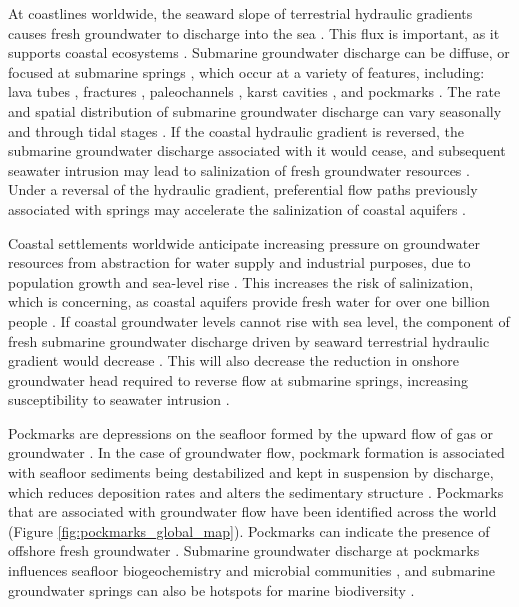 \documentclass[draft, 10pt]{agujournal2019}
\begin{document}
At coastlines worldwide, the seaward slope of terrestrial hydraulic gradients causes fresh groundwater to discharge into the sea \cite{arevalo-martinez_ideas_2023, taniguchi_submarine_2019, moore_effect_2010}.
This flux is important, as it supports coastal ecosystems \cite{burnett_groundwater_2003, moore_effect_2010}.
Submarine groundwater discharge can be diffuse, or focused at submarine springs \cite{taniguchi_submarine_2019},
which occur at a variety of features, including: lava tubes \cite{swarzenski_observations_2017},
fractures \cite{bokuniewicz_direct_2008, taniguchi_temporal_2008}, paleochannels \cite{mulligan_role_2007},
karst cavities \cite{fleury_submarine_2007}, and pockmarks \cite{hoffmann_fresh_2023, schluter_spatial_2004}.
The rate and spatial distribution of submarine groundwater discharge can vary seasonally and through tidal stages \cite{taniguchi_submarine_2019, lee_submarine_2016, dulai_autonomous_2016}.
If the coastal hydraulic gradient is reversed, the submarine groundwater discharge associated with it would cease,
and subsequent seawater intrusion may lead to salinization of fresh groundwater resources \cite{werner_seawater_2013, taniguchi_submarine_2019}.
Under a reversal of the hydraulic gradient, preferential flow paths previously associated with springs may accelerate the salinization of coastal aquifers \cite{geng_preferential_2020, xu_long_2016, falls_hydrogeology_2005}.

Coastal settlements worldwide anticipate increasing pressure on groundwater resources from abstraction for water supply and industrial purposes, due to population growth and sea-level rise \cite{michael_science_2017, oude_essink_effects_2010}.
This increases the risk of salinization, which is concerning, as coastal aquifers provide fresh water for over one billion people  \cite{ferguson_vulnerability_2012}.
If coastal groundwater levels cannot rise with sea level, the component of fresh submarine groundwater discharge driven by seaward terrestrial hydraulic gradient would decrease \cite{morgan_sea-level_2024}.
This will also decrease the reduction in onshore groundwater head required to reverse flow at submarine springs,
increasing susceptibility to seawater intrusion \cite{werner_classification_2017}.

Pockmarks are depressions on the seafloor formed by the upward flow of gas or groundwater \cite{hovland_significance_2002}.
In the case of groundwater flow, pockmark formation is associated with seafloor sediments being destabilized and kept in suspension by discharge,
which reduces deposition rates and alters the sedimentary structure \cite{micallef_can_2023, zhang_review_2025}.
Pockmarks that are associated with groundwater flow have been identified across the world (Figure \ref{fig:pockmarks_global_map}).
Pockmarks can indicate the presence of offshore fresh groundwater \cite{micallef_offshore_2021, post_offshore_2013, bertoni_seismic_2020, hoffmann_complex_2020}.
Submarine groundwater discharge at pockmarks influences seafloor biogeochemistry and microbial communities \cite{purkamo_impact_2022},
and submarine groundwater springs can also be hotspots for marine biodiversity \cite{burnett_economic_2017, alorda-kleinglass_social_2021}.
\end{document}
